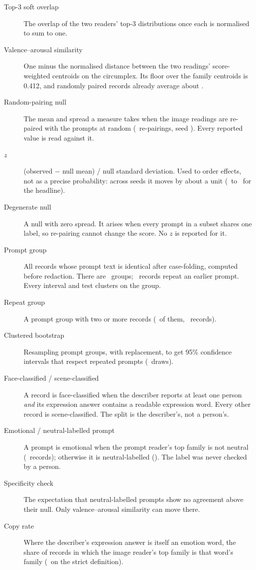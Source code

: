 \begin{description}
\item[Top-3 soft overlap] The overlap of the two readers' top-3 distributions once each is normalised to sum to one.
\item[Valence--arousal similarity] One minus the normalised distance between the two readings' score-weighted centroids on the circumplex. Its floor over the family centroids is 0.412, and randomly paired records already average about \FullNeuVaNull.
\item[Random-pairing null] The mean and spread a measure takes when the image readings are re-paired with the prompts at random (\nullShuffles\ re-pairings, seed \nullSeed). Every reported value is read against it.
\item[$z$] (observed $-$ null mean) / null standard deviation. Used to order effects, not as a precise probability: across seeds it moves by about a unit (\ZSeedMin\ to \ZSeedMax\ for the headline).
\item[Degenerate null] A null with zero spread. It arises when every prompt in a subset shares one label, so re-pairing cannot change the score. No $z$ is reported for it.
\item[Prompt group] All records whose prompt text is identical after case-folding, computed before redaction. There are \nDistinct\ groups; \nRepeats\ records repeat an earlier prompt. Every interval and test clusters on the group.
\item[Repeat group] A prompt group with two or more records (\nGroups\ of them, \nGroupRecords\ records).
\item[Clustered bootstrap] Resampling prompt groups, with replacement, to get 95\% confidence intervals that respect repeated prompts (\DiffDraws\ draws).
\item[Face-classified / scene-classified] A record is face-classified when the describer reports at least one person \emph{and} its expression answer contains a readable expression word. Every other record is scene-classified. The split is the describer's, not a person's.
\item[Emotional / neutral-labelled prompt] A prompt is emotional when the prompt reader's top family is not neutral (\nEmotional\ records); otherwise it is neutral-labelled (\nNonEmotional). The label was never checked by a person.
\item[Specificity check] The expectation that neutral-labelled prompts show no agreement above their null. Only valence--arousal similarity can move there.
\item[Copy rate] Where the describer's expression answer is itself an emotion word, the share of records in which the image reader's top family is that word's family (\DescCopyStrict\ on the strict definition).

\end{description}
